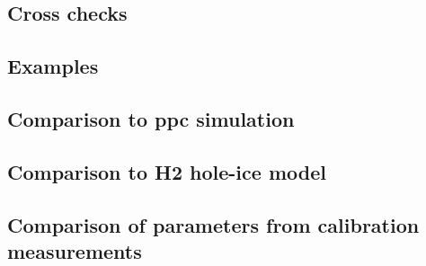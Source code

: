 \documentclass[green, 12pt]{beamer}
\begin{document}
\subsection{Cross checks}
  
  
  
  

\subsection{Examples}
  
  
  
  
  
  
  
  
  
%
%
%
%   
%
%   
%
%   
%
\subsection{Comparison to ppc simulation}
  
\subsection{Comparison to H2 hole-ice model}
  
\subsection{Comparison of parameters from calibration measurements}
  
\end{document}
